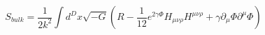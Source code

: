 \begin{equation}
S_{bulk}=\frac{1}{2k^2}\int d^D
x\sqrt{-G}(R-\frac{1}{12}e^{2\gamma\Phi}H_{\mu\nu\rho}H^{\mu\nu\rho}+
\gamma\partial_\mu\Phi
\partial^\mu\Phi)
\label{bulk0}
\end{equation}

